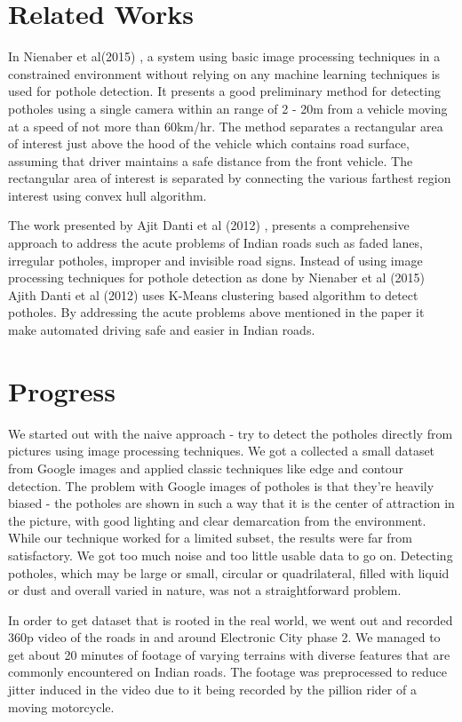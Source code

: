 \documentclass[12pt,a4paper]{article}
\begin{document}
\section{Related Works}
In Nienaber et al(2015) \cite{paperone}, a system using basic image processing techniques in a constrained environment without relying on any machine learning techniques is used for pothole detection. It presents a good preliminary method for detecting potholes using a single camera within an range of 2 - 20m from a vehicle moving at a speed of not more than 60km/hr. The method separates a rectangular area of interest just above the hood of the vehicle which contains road surface, assuming that driver maintains a safe distance from the front vehicle. The rectangular area of interest is separated by connecting the various farthest region interest using convex hull algorithm.

The work presented by Ajit Danti et al (2012) \cite{papertwo}, presents a comprehensive approach to address the acute problems of Indian roads such as faded lanes, irregular potholes, improper and invisible road signs. Instead of using image processing techniques for pothole detection as done by Nienaber et al (2015) Ajith Danti et al (2012) uses K-Means clustering based algorithm to detect potholes. By addressing the acute problems above mentioned in the paper it make automated driving safe and easier in Indian roads. 


\section{Progress}
We started out with the naive approach - try to detect the potholes directly from pictures using image processing techniques. We got a collected a small dataset from Google images and applied classic techniques like edge and contour detection. The problem with Google images of potholes is that they're heavily biased - the potholes are shown in such a way that it is the center of attraction in the picture, with good lighting and clear demarcation from the environment. While our technique worked for a limited subset, the results were far from satisfactory. We got too much noise and too little usable data to go on. Detecting potholes, which may be large or small, circular or quadrilateral, filled with liquid or dust and overall varied in nature, was not a straightforward problem.

In order to get dataset that is rooted in the real world, we went out and recorded 360p video of the roads in and around Electronic City phase 2. We managed to get about 20 minutes of footage of varying terrains with diverse features that are commonly encountered on Indian roads. The footage was preprocessed to reduce jitter induced in the video due to it being recorded by the pillion rider of a moving motorcycle. 
\end{document}

